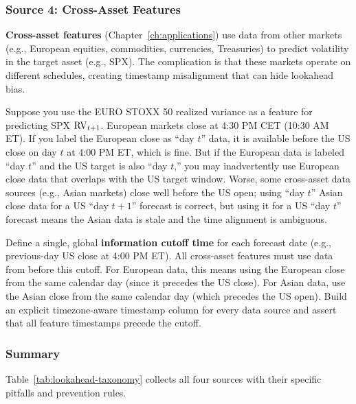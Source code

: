 \subsubsection{Source 4: Cross-Asset Features}

\textbf{Cross-asset features} (Chapter~\ref{ch:applications}) use data from other markets (e.g., European equities, commodities, currencies, Treasuries) to predict volatility in the target asset (e.g., SPX).
The complication is that these markets operate on different schedules, creating timestamp misalignment that can hide lookahead bias.

\begin{warning}
Suppose you use the EURO STOXX 50 realized variance as a feature for predicting SPX $\operatorname{RV}_{t+1}$.
European markets close at 4:30 PM CET (10:30 AM ET).
If you label the European close as ``day $t$'' data, it is available before the US close on day $t$ at 4:00 PM ET, which is fine.
But if the European data is labeled ``day $t$'' and the US target is also ``day $t$,'' you may inadvertently use European close data that overlaps with the US target window.
Worse, some cross-asset data sources (e.g., Asian markets) close well before the US open; using ``day $t$'' Asian close data for a US ``day $t{+}1$'' forecast is correct, but using it for a US ``day $t$'' forecast means the Asian data is stale and the time alignment is ambiguous.
\end{warning}

\begin{keyidea}
Define a single, global \textbf{information cutoff time} for each forecast date (e.g., previous-day US close at 4:00 PM ET).
All cross-asset features must use data from before this cutoff.
For European data, this means using the European close from the same calendar day (since it precedes the US close).
For Asian data, use the Asian close from the same calendar day (which precedes the US open).
Build an explicit timezone-aware timestamp column for every data source and assert that all feature timestamps precede the cutoff.
\end{keyidea}


\subsubsection{Summary}

Table~\ref{tab:lookahead-taxonomy} collects all four sources with their specific pitfalls and prevention rules.

